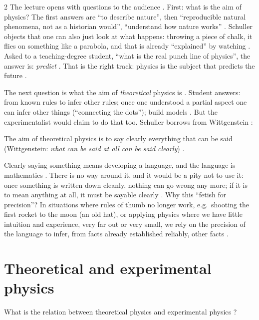 \begin{paracol}{2}
The lecture opens with questions to the audience . First: what is the aim of physics?
The first answers are ``to describe nature'', then ``reproducible natural phenomena, not as a historian would'',
``understand how nature works'' . Schuller objects that one can also just
look at what happens: throwing a piece of chalk, it flies on something like a parabola, and that is already
``explained'' by watching . Asked to a teaching-degree student, ``what is the real punch line of
physics'', the answer is: \emph{predict} . That is the right track: physics is the
subject that predicts the future .

The next question is what the aim of \emph{theoretical} physics is . Student answers: from known
rules to infer other rules; once one understood a partial aspect one can infer other things (``connecting the dots'');
build models . But the experimentalist would claim to do that too.
Schuller borrows from Wittgenstein :

\begin{definition}\label{def:bv-aim}
The aim of theoretical physics is to say clearly everything that can be said (Wittgenstein: \emph{what can be said
at all can be said clearly}) .
\end{definition}
Clearly saying something means developing a language, and the language is mathematics .
There is no way around it, and it would be a pity not to use it: once something is written down cleanly, nothing can
go wrong any more; if it is to mean anything at all, it must be sayable clearly .
Why this ``fetish for precision''? In situations where rules of thumb no longer work, e.g.\ shooting the first
rocket to the moon (an old hat), or applying physics where we have little intuition and experience, very far out or
very small, we rely on the precision of the language to infer, from facts already established reliably, other facts
.

\section{Theoretical and experimental physics}\label{sec:bv-theory-exp}

What is the relation between theoretical physics and experimental physics ?


\end{paracol}
